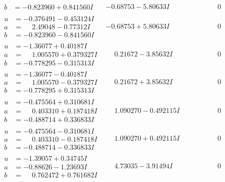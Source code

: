 \documentclass[1p]{elsarticle_modified}
\theoremstyle{definition}
\begin{document}
$$\begin{array}{c|c|c}
\begin{aligned}
b &= -0.823960 + 0.841560 I\end{aligned}
 & -0.68753 - 5.80633 I & \phantom{-0.000000 } 0 \\ \hline\begin{aligned}
u &= -0.376491 - 0.453124 I \\
a &= \phantom{-}2.49048 - 0.77312 I \\
b &= -0.823960 - 0.841560 I\end{aligned}
 & -0.68753 + 5.80633 I & \phantom{-0.000000 } 0 \\ \hline\begin{aligned}
u &= -1.36077 + 0.40187 I \\
a &= \phantom{-}1.005570 + 0.379327 I \\
b &= -0.778295 - 0.315313 I\end{aligned}
 & \phantom{-}0.21672 - 3.85632 I & \phantom{-0.000000 } 0 \\ \hline\begin{aligned}
u &= -1.36077 - 0.40187 I \\
a &= \phantom{-}1.005570 - 0.379327 I \\
b &= -0.778295 + 0.315313 I\end{aligned}
 & \phantom{-}0.21672 + 3.85632 I & \phantom{-0.000000 } 0 \\ \hline\begin{aligned}
u &= -0.475564 + 0.310681 I \\
a &= \phantom{-}0.403310 + 0.187418 I \\
b &= -0.488714 + 0.336833 I\end{aligned}
 & \phantom{-}1.090270 - 0.492115 I & \phantom{-0.000000 } 0 \\ \hline\begin{aligned}
u &= -0.475564 - 0.310681 I \\
a &= \phantom{-}0.403310 - 0.187418 I \\
b &= -0.488714 - 0.336833 I\end{aligned}
 & \phantom{-}1.090270 + 0.492115 I & \phantom{-0.000000 } 0 \\ \hline\begin{aligned}
u &= -1.39057 + 0.34745 I \\
a &= -0.88626 - 1.23693 I \\
b &= \phantom{-}0.762472 + 0.761682 I\end{aligned}
 & \phantom{-}4.73035 - 3.91494 I & \phantom{-0.000000 } 0 \\ \hline\begin{aligned}

\end{aligned}
\end{array}$$
\end{document}
